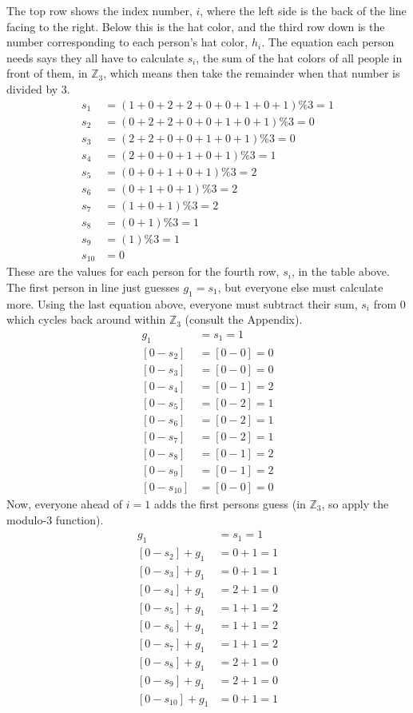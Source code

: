 \documentclass[10pt]{article}
\begin{document}
The top row shows the index number, $i$, where the left side is the back of 
the line facing to the right. Below this is the hat color, and the third 
row down is the number corresponding to each person's hat color, $h_i$. 
The equation each person needs says they all have to calculate $s_i$, 
the sum of the hat colors of all people in front of them, in $\mathbb{Z}_3$, 
which means then take the remainder when that number is divided by 3.
\begin{align*}
    s_1 &= (1+0+2+2+0+0+1+0+1)\%3 = 1 \\
    s_2 &= (0+2+2+0+0+1+0+1)\%3 = 0 \\
    s_3 &= (2+2+0+0+1+0+1)\%3 = 0 \\
    s_4 &= (2+0+0+1+0+1)\%3 = 1 \\
    s_5 &= (0+0+1+0+1)\%3 = 2 \\
    s_6 &= (0+1+0+1)\%3 = 2 \\
    s_7 &= (1+0+1)\%3 = 2 \\
    s_8 &= (0+1)\%3 = 1 \\
    s_9 &= (1)\%3 = 1 \\
    s_{10} &= 0 
\end{align*}
These are the values for each person for the fourth row, $s_i$, in the 
table above. 
The first person in line just guesses $g_1=s_1$, but everyone else must 
calculate more. Using the last equation above, everyone must 
subtract their sum, $s_i$ from 0 which cycles back around within $\mathbb{Z}_3$
(consult the Appendix).
\begin{align*}
    g_1 &= s_1 = 1 \\
    [0-s_2] &= [0-0] = 0 \\
    [0-s_3] &= [0-0] = 0 \\
    [0-s_4] &= [0-1] = 2 \\
    [0-s_5] &= [0-2] = 1 \\
    [0-s_6] &= [0-2] = 1 \\
    [0-s_7] &= [0-2] = 1 \\
    [0-s_8] &= [0-1] = 2 \\
    [0-s_9] &= [0-1] = 2 \\
    [0-s_{10}] &= [0-0] = 0 
\end{align*}
Now, everyone ahead of $i=1$ adds the first persons guess (in $\mathbb{Z}_3$, 
so apply the modulo-3 function).
\begin{align*}
    g_1 &= s_1 = 1 \\
    [0-s_2]+g_1 &= 0+1=1 \\
    [0-s_3]+g_1 &= 0+1=1 \\
    [0-s_4]+g_1 &= 2+1=0 \\
    [0-s_5]+g_1 &= 1+1=2 \\
    [0-s_6]+g_1 &= 1+1=2 \\
    [0-s_7]+g_1 &= 1+1=2 \\
    [0-s_8]+g_1 &= 2+1=0 \\
    [0-s_9]+g_1 &= 2+1=0 \\
    [0-s_{10}]+g_1 &= 0+1=1 
\end{align*}
\end{document}
